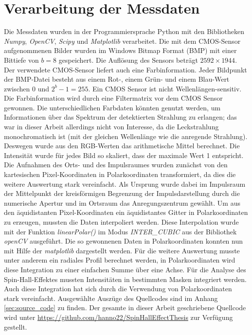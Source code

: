 \documentclass[a4paper, titlepage,  ngerman]{book}
\begin{document}
	\section{Verarbeitung der Messdaten}
	\label{sec:polar_calculation}
	Die Messdaten wurden in der Programmiersprache Python mit den Bibliotheken \textit{Numpy}, \textit{OpenCV}, \textit{Scipy} und \textit{Matplotlib} verarbeitet. Die mit dem CMOS-Sensor aufgenommenen Bilder wurden im Windows Bitmap Format (BMP) mit einer Bittiefe von  $b = 8$ gespeichert. Die Auflösung des Sensors beträgt $2592 \times 1944$. Der verwendete CMOS-Sensor liefert auch eine Farbinformation. Jeder Bildpunkt der BMP-Datei besteht aus einem Rot-, einem Grün- und einem Blau-Wert zwischen $0$ und $2^b - 1= 255$. Ein CMOS Sensor ist nicht Wellenlängen-sensitiv. Die Farbinformation wird durch eine Filtermatrix vor dem CMOS Sensor gewonnen. Die unterschiedlichen Farbdaten könnten genutzt werden, um Informationen über das Spektrum der detektierten Strahlung zu erlangen; das war in dieser Arbeit allerdings nicht von Interesse, da die Leckstrahlung monochromatisch ist (mit der gleichen Wellenlänge wie die anregende Strahlung). Deswegen wurde aus den RGB-Werten das arithmetische Mittel berechnet. Die Intensität wurde für jedes Bild so skaliert, dass der maximale Wert 1 entspricht. Die Aufnahmen des Orts- und des Impulsraumes wurden zunächst von den kartesischen Pixel-Koordinaten in Polarkoordinaten transformiert, da dies die weitere Auswertung stark vereinfacht. Als Ursprung wurde dabei im Impulsraum der Mittelpunkt der kreisförmigen Begrenzung der Impulsdarstellung durch die numerische Apertur und im Ortsraum das Anregungszentrum gewählt. Um aus den äquidistanten Pixel-Koordinaten ein äquidistantes Gitter in Polarkoordinaten zu erzeugen, mussten die Daten interpoliert werden. Diese Interpolation wurde mit der Funktion \textit{linearPolar()} im Modus \textit{INTER\_CUBIC} aus der Bibliothek \textit{openCV} ausgeführt. Die so gewonnenen Daten in Polarkoordinaten konnten nun mit Hilfe der \textit{matplotlib} dargestellt werden. Für die weitere Auswertung musste unter anderem ein radiales Profil berechnet werden, in Polarkoordinaten wird diese Integration zu einer einfachen Summe über eine Achse. Für die Analyse des Spin-Hall-Effektes mussten Intensitäten in bestimmten Masken integriert werden. Auch diese Integration hat sich durch die Verwendung von Polarkoordinaten stark vereinfacht. Ausgewählte Auszüge des Quellcodes sind im Anhang \ref{sec:source_code} zu finden. Der gesamte in dieser Arbeit geschriebene Quellcode wird unter \url{https://github.com/hanno22/SpinHallEffectThesis} zur Verfügung gestellt.
	\newpage
	
\end{document}
